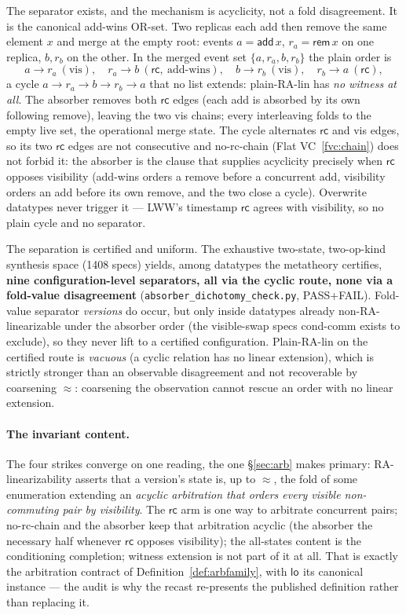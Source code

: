 \documentclass[11pt]{article}
\newcommand{\rcrel}{\mathsf{rc}}                 %
\newcommand{\add}{\mathsf{add}}
\newcommand{\rem}{\mathsf{rem}}
\newcommand{\loE}[1]{\mathsf{lo}^{#1}}
\newcommand{\lean}[1]{\texttt{#1}}
\newcommand{\eqobs}{\approx}
\begin{document}
The separator exists, and the mechanism is acyclicity, not a fold
disagreement. It is the canonical add-wins OR-set. Two replicas each add
then remove the same element $x$ and merge at the empty root: events
$a = \add\,x$, $r_a = \rem\,x$ on one replica, $b, r_b$ on the other. In
the merged event set $\{a, r_a, b, r_b\}$ the plain order is
\[
  a \to r_a \ (\text{vis}), \quad
  r_a \to b \ (\rcrel,\ \text{add-wins}), \quad
  b \to r_b \ (\text{vis}), \quad
  r_b \to a \ (\rcrel),
\]
a cycle $a \to r_a \to b \to r_b \to a$ that no list extends: plain-RA-lin
has \emph{no witness at all}. The absorber removes both $\rcrel$ edges
(each add is absorbed by its own following remove), leaving the two vis
chains; every interleaving folds to the empty live set, the operational
merge state. The cycle alternates $\rcrel$ and vis edges, so its two
$\rcrel$ edges are not consecutive and no-rc-chain (Flat
VC~\ref{fvc:chain}) does not forbid it: the absorber is the clause that
supplies acyclicity precisely when $\rcrel$ opposes visibility (add-wins
orders a remove before a concurrent add, visibility orders an add before
its own remove, and the two close a cycle). Overwrite datatypes never
trigger it --- LWW's timestamp $\rcrel$ agrees with visibility, so no plain
cycle and no separator.

The separation is certified and uniform. The exhaustive two-state,
two-op-kind synthesis space (1408 specs) yields, among datatypes the
metatheory certifies, \textbf{nine configuration-level separators, all via
the cyclic route, none via a fold-value disagreement}
(\lean{absorber\_dichotomy\_check.py}, PASS+FAIL). Fold-value separator
\emph{versions} do occur, but only inside datatypes already
non-RA-linearizable under the absorber order (the visible-swap specs
cond-comm exists to exclude), so they never lift to a certified
configuration. Plain-RA-lin on the certified route is \emph{vacuous} (a
cyclic relation has no linear extension), which is strictly stronger than
an observable disagreement and not recoverable by coarsening $\eqobs$:
coarsening the observation cannot rescue an order with no linear extension.

\paragraph{The invariant content.} The four strikes converge on one
reading, the one \S\ref{sec:arb} makes primary: RA-linearizability asserts
that a version's state is, up to $\eqobs$, the fold of some enumeration
extending an \emph{acyclic arbitration that orders every visible
non-commuting pair by visibility}. The $\rcrel$ arm is one way to arbitrate
concurrent pairs; no-rc-chain and the absorber keep that arbitration
acyclic (the absorber the necessary half whenever $\rcrel$ opposes
visibility); the all-states content is the conditioning completion; witness
extension is not part of it at all. That is exactly the arbitration
contract of Definition~\ref{def:arbfamily}, with $\loE{}$ its canonical
instance --- the audit is why the recast re-presents the published
definition rather than replacing it.
\end{document}
